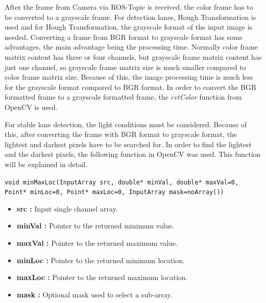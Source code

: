After the frame from Camera via ROS-Topic is received, the color frame has to be converted to a grayscale frame. For detection lanes, Hough Transformation is used and for Hough Transformation, the grayscale format of the input image is needed. Converting a frame from BGR format to grayscale format has some advantages, the main advantage being the processing time. Normally color frame matrix content has three or four channels, but grayscale frame matrix content has just one channel, so grayscale frame matrix size is much smaller compared to color frame matrix size. Because of this, the image processing time is much less for the grayscale format compared to BGR format. In order to convert the BGR formatted frame to a grayscale formatted frame, the \textit{cvtColor} function from OpenCV is used.

For stable lane detection, the light conditions must be considered. Because of this, after converting the frame with BGR format to grayscale format, the lightest and darkest pixels have to be searched for. In order to find the lightest and the darkest pixels, the following function in OpenCV was used. This function will be explained in detail.\cite{addWeighted}


\begin{center}

\texttt{void minMaxLoc(InputArray src, double* minVal, double* maxVal=0, Point* minLoc=0, Point* maxLoc=0, InputArray mask=noArray())}

\end{center}

\begin{itemize}

\item \textbf{src : }Input single channel array.

\item \textbf{minVal : }Pointer to the returned minimum value.

\item \textbf{maxVal : }Pointer to the returned maximum value.

\item \textbf{minLoc : }Pointer to the returned minimum location.

\item \textbf{maxLoc : }Pointer to the returned maximum location.

\item \textbf{mask : }Optional mask used to select a sub-array.

\end{itemize}



